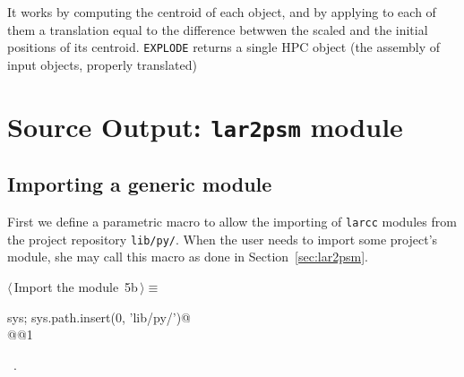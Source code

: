\documentclass[11pt,oneside]{article}	%
\begin{document}
It works by computing the centroid of each object, and by applying to each of them a translation equal to the difference betwwen the scaled and the initial positions of its centroid. 
\texttt{EXPLODE}  returns a single HPC object (the assembly of input objects, properly translated)

\section{Source Output: \texttt{lar2psm} module}


\subsection{Importing a generic module}
First we define a parametric macro to allow the importing of \texttt{larcc} modules from the project repository \texttt{lib/py/}. When the user needs to import some project's module, she may call this macro as done in Section~\ref{sec:lar2psm}.
\begin{flushleft} \small
\begin{minipage}{\linewidth} \label{scrap13}
\protect{}$\langle\,$Import the module\nobreak\ {\footnotesize 5b}$\,\rangle\equiv$
\vspace{-1ex}
\begin{list}{}{} \item
\mbox{}\verb@import sys; sys.path.insert(0, 'lib/py/')@\\
\mbox{}\verb@import @@1\verb@@\\
\mbox{}\verb@@{\NWsep}
\end{list}
\vspace{-1ex}
\footnotesize\addtolength{\baselineskip}{-1ex}
\begin{list}{}{\setlength{\itemsep}{-\parsep}\setlength{\itemindent}{-\leftmargin}}
\item \NWtxtMacroRefIn\ .
\end{list}
\end{minipage}\\[4ex]
\end{flushleft}
\end{document}
